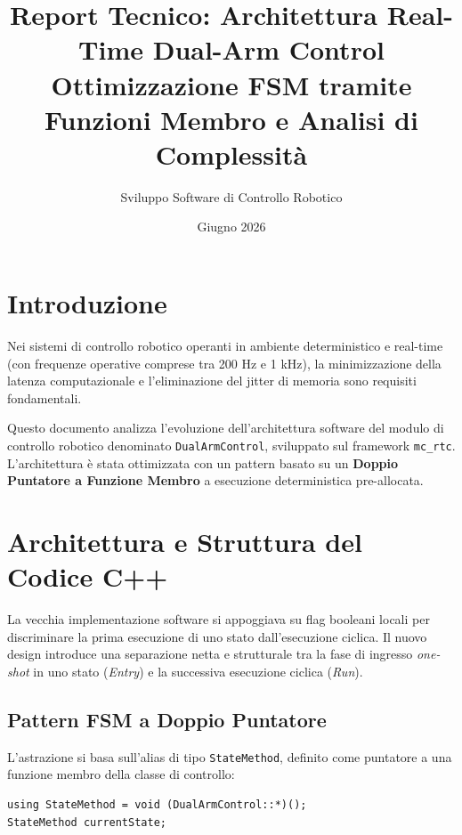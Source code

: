 \documentclass[11pt,a4paper]{article}
\title{\textbf{Report Tecnico: Architettura Real-Time Dual-Arm Control}\\ \large Ottimizzazione FSM tramite Funzioni Membro e Analisi di Complessità}
\author{Sviluppo Software di Controllo Robotico}
\date{Giugno 2026}
\begin{document}
\maketitle
\tableofcontents
\newpage

\section{Introduzione}
Nei sistemi di controllo robotico operanti in ambiente deterministico e real-time (con frequenze operative comprese tra 200 Hz e 1 kHz), la minimizzazione della latenza computazionale e l'eliminazione del jitter di memoria sono requisiti fondamentali.

Questo documento analizza l'evoluzione dell'architettura software del modulo di controllo robotico denominato \texttt{DualArmControl}, sviluppato sul framework \texttt{mc\_rtc}. L'architettura è stata ottimizzata con un pattern basato su un \textbf{Doppio Puntatore a Funzione Membro} a esecuzione deterministica pre-allocata.


\section{Architettura e Struttura del Codice C++}
La vecchia implementazione software si appoggiava su flag booleani locali per discriminare la prima esecuzione di uno stato dall'esecuzione ciclica. Il nuovo design introduce una separazione netta e strutturale tra la fase di ingresso \textit{one-shot} in uno stato (\textit{Entry}) e la successiva esecuzione ciclica (\textit{Run}).

\subsection{Pattern FSM a Doppio Puntatore}
L'astrazione si basa sull'alias di tipo \texttt{StateMethod}, definito come puntatore a una funzione membro della classe di controllo:

\begin{lstlisting}
using StateMethod = void (DualArmControl::*)();
StateMethod currentState;
\end{lstlisting}
\end{document}
